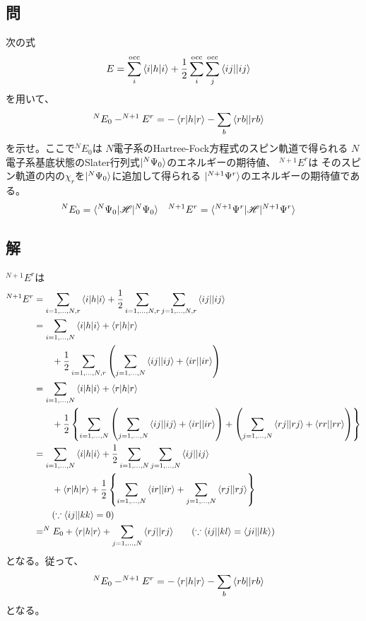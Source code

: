 \subsection{問}
次の式
\begin{align}
	E
&=
	\sum_i^{\rm occ}
		\braket{i|h|i}
	+
	\frac{1}{2}
	\sum_i^{\rm occ}
	\sum_j^{\rm occ}
		{\braket{ij||ij}}
\end{align}
を用いて、
\begin{align}
	^{N}E_{0}
	-
	^{N+1}E^r
&=
	-
	\braket{r|h|r}
	-
	\sum_b
		{\braket{rb||rb}}
\end{align}
を示せ。ここで$^{N}E_0$は
$N$電子系のHartree-Fock方程式のスピン軌道で得られる
$N$電子系基底状態のSlater行列式$\ket{^{N}\Psi_0}$のエネルギーの期待値、
$^{N+1}E^r$は
そのスピン軌道の内の$\chi_r$を$\ket{^{N}\Psi_0}$に追加して得られる
$\ket{^{N+1}\Psi^r}$のエネルギーの期待値である。
\begin{align}
	^{N}E_0
&=
	\braket{^{N}\Psi_0|\H|^{N}\Psi_0} &
%
	^{N+1}E^r
&=
	\braket{^{N+1}\Psi^r|\H|^{N+1}\Psi^r}
\end{align}



\subsection{解}
$^{N+1}E^r$は
\begin{align}
	^{N+1}E^r
&=
	\sum_{i=1,\dots,N,r}
		\braket{i|h|i}
	+
	\frac{1}{2}
	\sum_{i=1,\dots,N,r}
	\sum_{j=1,\dots,N,r}
		\antitwo{ij}{ij} \\
%
%
&=
	\sum_{i=1,\dots,N}
		\braket{i|h|i}
	+
	\braket{r|h|r} \nonumber \\&\qquad
	+
	\frac{1}{2}
	\sum_{i=1,\dots,N,r}\left(
		\sum_{j=1,\dots,N}
			\antitwo{ij}{ij}
		+
		\antitwo{ir}{ir}
	\right) \\
%
%
&=
	\sum_{i=1,\dots,N}
		\braket{i|h|i}
	+
	\braket{r|h|r} \nonumber \\&\qquad
	+
	\frac{1}{2}
	\left\{
		\sum_{i=1,\dots,N}\left(
			\sum_{j=1,\dots,N}
				\antitwo{ij}{ij}
			+
			\antitwo{ir}{ir}
		\right)
		+
		\left(
			\sum_{j=1,\dots,N}
				\antitwo{rj}{rj}
			+
			\antitwo{rr}{rr}
		\right)
	\right\} \\
%
%
&=
	\sum_{i=1,\dots,N}
		\braket{i|h|i}
	+
	\frac{1}{2}
	\sum_{i=1,\dots,N}
	\sum_{j=1,\dots,N}
		\antitwo{ij}{ij} \nonumber \\&\qquad
	+
	\braket{r|h|r}
	+
	\frac{1}{2}\left\{
		\sum_{i=1,\dots,N}
			\antitwo{ir}{ir}
		+
		\sum_{j=1,\dots,N}
			\antitwo{rj}{rj}
	\right\} \nonumber \\&\qquad
	(\because \antitwo{ij}{kk}=0) \\
%
%
&=
	^{N}E_0
	+
	\braket{r|h|r}
	+
	\sum_{j=1,\dots,N}
		\antitwo{rj}{rj}
	\qquad
	(\because \antitwo{ij}{kl}=\antitwo{ji}{lk})
\end{align}
となる。従って、
\begin{align}
	^{N}E_{0}
	-
	^{N+1}E^r
&=
	-
	\braket{r|h|r}
	-
	\sum_b
		{\braket{rb||rb}}
\end{align}
となる。

